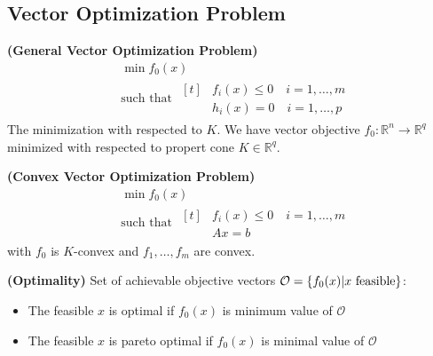 \subsection{Vector Optimization Problem}

\begin{definition}{\textbf{(General Vector Optimization Problem)}}
    \begin{equation*}
    \begin{aligned}
        &\min f_0(x) \\
        &\text{such that } \begin{aligned}[t]
            &f_i(x)\le0 \quad i=1,\dots,m \\
            &h_i(x)=0 \quad i=1,\dots,p
        \end{aligned}
    \end{aligned}
    \end{equation*}
    The minimization with respected to $K$. We have vector objective $f_0:\mathbb{R}^n\rightarrow \mathbb{R}^q$ minimized with respected to propert cone $K\in \mathbb{R}^q$.
\end{definition}

\begin{definition}{\textbf{(Convex Vector Optimization Problem)}}
    \begin{equation*}
    \begin{aligned}
        &\min f_0(x) \\
        &\text{such that } \begin{aligned}[t]
            &f_i(x)\le0 \quad i=1,\dots,m \\
            &Ax=b
        \end{aligned}
    \end{aligned}
    \end{equation*}
    with $f_0$ is $K$-convex and $f_1,\dots,f_m$ are convex. 
\end{definition}

\begin{definition}{\textbf{(Optimality)}}
    Set of achievable objective vectors $\mathcal{O} = \left\{ f_0(x) | x \text{ feasible}  \right\}$:
    \begin{itemize}
        \item The feasible $x$ is optimal if $f_0(x)$ is minimum value of $\mathcal{O}$
        \item The feasible $x$ is pareto optimal if $f_0(x)$ is minimal value of $\mathcal{O}$
    \end{itemize}
\end{definition}


